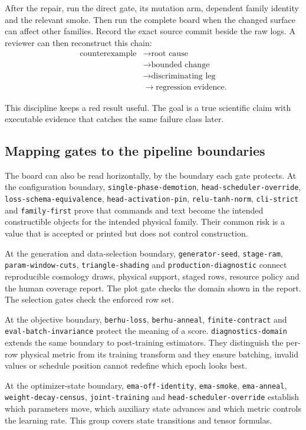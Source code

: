 \documentclass[10pt,aps,prd,twocolumn,nofootinbib]{revtex4-2}
\newcommand{\code}[1]{\texttt{#1}}
\begin{document}
After the repair, run the direct gate, its mutation arm, dependent family
identity and the relevant smoke.  Then run the complete board when the changed
surface can affect other families.  Record the exact source commit beside the
raw logs.  A reviewer can then reconstruct this chain:
\begin{align*}
 \text{counterexample}&\rightarrow\text{root cause}\\
 &\rightarrow\text{bounded change}\\
 &\rightarrow\text{discriminating leg}\\
 &\rightarrow\text{regression evidence}.
\end{align*}

This discipline keeps a red result useful.  The goal is a true scientific
claim with executable evidence that catches the same failure class later.

\subsection{Mapping gates to the pipeline boundaries}

The board can also be read horizontally, by the boundary each gate protects.
At the configuration boundary, \code{single-phase-demotion},
\code{head-scheduler-override}, \code{loss-schema-equivalence},
\code{head-activation-pin}, \code{relu-tanh-norm}, \code{cli-strict} and
\code{family-first} prove that commands and text become the intended
constructible objects for the intended physical family.  Their common risk is
a value that is accepted or printed but does not control construction.

At the generation and data-selection boundary, \code{generator-seed},
\code{stage-ram}, \code{param-window-cuts}, \code{triangle-shading} and
\code{production-diagnostic} connect reproducible cosmology draws, physical
support, staged rows, resource policy and the human coverage report.  The
plot gate checks the domain shown in the report.  The selection gates check
the enforced row set.

At the objective boundary, \code{berhu-loss},
\code{berhu-anneal}, \code{finite-contract} and
\code{eval-batch-invariance} protect the meaning of a score.
\code{diagnostics-domain} extends the same boundary to post-training
estimators.  They distinguish the per-row physical metric from its training
transform and they ensure batching, invalid values or schedule position
cannot redefine which epoch looks best.

At the optimizer-state boundary, \code{ema-off-identity},
\code{ema-smoke}, \code{ema-anneal}, \code{weight-decay-census},
\code{joint-training} and \code{head-scheduler-override} establish which
parameters move, which auxiliary state advances and which metric controls
the learning rate.  This group covers state transitions and tensor formulas.
\end{document}
